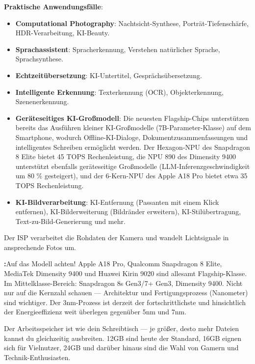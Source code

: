 \textbf{Praktische Anwendungsfälle}:

\begin{itemize}
  \item \textbf{Computational Photography}: Nachtsicht-Synthese, Porträt-Tiefenschärfe, HDR-Verarbeitung, KI-Beauty.
  \item \textbf{Sprachassistent}: Spracherkennung, Verstehen natürlicher Sprache, Sprachsynthese.
  \item \textbf{Echtzeitübersetzung}: KI-Untertitel, Gesprächsübersetzung.
  \item \textbf{Intelligente Erkennung}: Texterkennung (OCR), Objekterkennung, Szenenerkennung.
  \item \textbf{Geräteseitiges KI-Großmodell}: Die neuesten Flagship-Chips unterstützen bereits das Ausführen kleiner KI-Großmodelle (7B-Parameter-Klasse) auf dem Smartphone, wodurch Offline-KI-Dialoge, Dokumentzusammenfassungen und intelligentes Schreiben ermöglicht werden. Der Hexagon-NPU des Snapdragon 8 Elite bietet 45 TOPS Rechenleistung, die NPU 890 des Dimensity 9400 unterstützt ebenfalls geräteseitige Großmodelle (LLM-Inferenzgeschwindigkeit um 80 \% gesteigert), und der 6-Kern-NPU des Apple A18 Pro bietet etwa 35 TOPS Rechenleistung.
  \item \textbf{KI-Bildverarbeitung}: KI-Entfernung (Passanten mit einem Klick entfernen), KI-Bilderweiterung (Bildränder erweitern), KI-Stilübertragung, Text-zu-Bild-Generierung und mehr.
\end{itemize}


Der ISP verarbeitet die Rohdaten der Kamera und wandelt Lichtsignale in ansprechende Fotos um.

\textbf{:}Auf das Modell achten! Apple A18 Pro, Qualcomm Snapdragon 8 Elite, MediaTek Dimensity 9400 und Huawei Kirin 9020 sind allesamt Flagship-Klasse. Im Mittelklasse-Bereich: Snapdragon 8s Gen3/7+ Gen3, Dimensity 9400. Nicht nur auf die Kernzahl schauen — Architektur und Fertigungsprozess (Nanometer) sind wichtiger. Der 3nm-Prozess ist derzeit der fortschrittlichste und hinsichtlich der Energieeffizienz weit überlegen gegenüber 5nm und 7nm.


Der Arbeitsspeicher ist wie dein Schreibtisch — je größer, desto mehr Dateien kannst du gleichzeitig ausbreiten. 12GB sind heute der Standard, 16GB eignen sich für Vielnutzer, 24GB und darüber hinaus sind die Wahl von Gamern und Technik-Enthusiasten.

